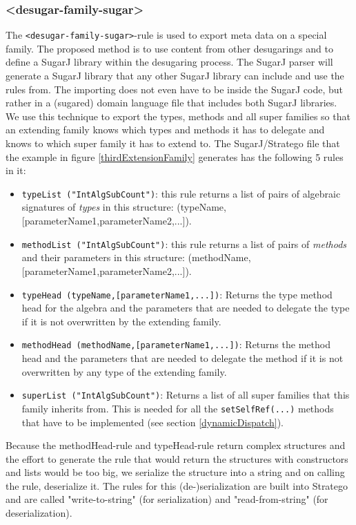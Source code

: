 \documentclass{report}
\begin{document}
\subsubsection{\textless{}desugar-family-sugar\textgreater}
The \lstinline{<desugar-family-sugar>}-rule is used to export meta data on a special family. The proposed method is to use content from other desugarings and to define a SugarJ library within the desugaring process. The SugarJ parser will generate a SugarJ library that any other SugarJ library can include and use the rules from. The importing does not even have to be inside the SugarJ code, but rather in a (sugared) domain language file that includes both SugarJ libraries. We use this technique to export the types, methods and all super families so that an extending family knows which types and methods it has to delegate and knows to which super family it has to extend to. The SugarJ/Stratego file that the example in figure \ref{thirdExtensionFamily} generates has the following 5 rules in it:
\begin{itemize}
    \item \lstinline{typeList ("IntAlgSubCount")}: this rule returns a list of pairs of algebraic signatures of \emph{types} in this structure: (typeName,[parameterName1,parameterName2,...]).
    \item \lstinline{methodList ("IntAlgSubCount")}: this rule returns a list of pairs of \emph{methods} and their parameters in this structure: (methodName,[parameterName1,parameterName2,...]).
    \item \lstinline{typeHead (typeName,[parameterName1,...])}: Returns the type method head for the algebra and the parameters that are needed to delegate the type if it is not overwritten by the extending family.
    \item \lstinline{methodHead (methodName,[parameterName1,...])}: Returns the method head and the parameters that are needed to delegate the method if it is not overwritten by any type of the extending family.
    \item \lstinline{superList ("IntAlgSubCount")}: Returns a list of all super families that this family inherits from. This is needed for all the \lstinline{setSelfRef(...)} methods that have to be implemented (see section \ref{dynamicDispatch}).
\end{itemize}
Because the methodHead-rule and typeHead-rule return complex structures and the effort to generate the rule that would return the structures with constructors and lists would be too big, we serialize the structure into a string and on calling the rule, deserialize it. The rules for this (de-)serialization are built into Stratego and are called "write-to-string" (for serialization) and "read-from-string" (for deserialization).
\end{document}

